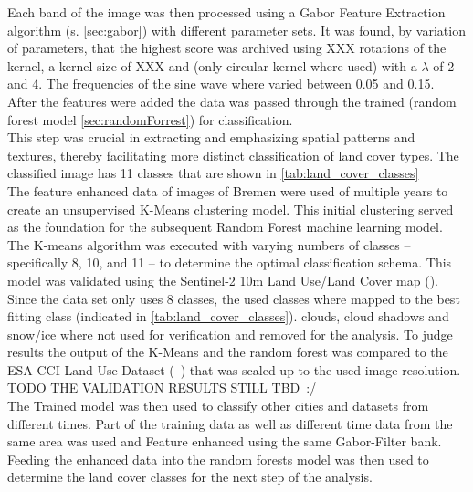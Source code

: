 \documentclass[12pt,a4paper, english,twoside]{article}
\begin{document}
    Each band of the image was then processed using a Gabor Feature Extraction algorithm (s. \cref{sec:gabor}) with different parameter sets. 
    It was found, by variation of parameters, that the highest score was archived using XXX 
    rotations of the kernel, a kernel size of XXX
    and (only circular kernel where used) with a $\lambda$ of 2 and 4. %
    The frequencies of the sine wave where varied between 0.05 and 0.15. \\ 
    After the features were added the data was passed through the trained (random forest model \cref{sec:randomForrest}) for classification. \\
%
    This step was crucial in extracting and emphasizing spatial patterns and textures, thereby facilitating more distinct classification of land cover types. %
    The classified image has 11 classes that are shown in \cref{tab:land_cover_classes}
    \\
    The feature enhanced data of images of Bremen%
    were used of multiple years to create an unsupervised K-Means clustering model.%
    This initial clustering served as the foundation for the subsequent Random Forest machine learning model.
    The K-means algorithm was executed with varying numbers of classes – specifically 8, 10, and 11 – to determine the optimal classification schema.
    This model was validated using the Sentinel-2 10m Land Use/Land Cover map (\cite{Zhang}).
    Since the data set only uses 8 classes, the used classes where mapped to the best fitting class (indicated in \cref{tab:land_cover_classes}). 
    clouds, cloud shadows and snow/ice where not used for verification and removed for the analysis.
    To judge results the output of the K-Means and the random forest was compared to the ESA CCI Land Use Dataset (~\cite{landformclassicationusingfuzzykmeans2000}) that was scaled up to the used image resolution. %
    \\
    TODO THE VALIDATION RESULTS STILL TBD~:/%
    \\ 
    The Trained model was then used to classify other cities and datasets from different times. 
    Part of the training data as well as different time data from the same area was used and Feature enhanced using the same Gabor-Filter bank.
    Feeding the enhanced data into the random forests model was then used to determine the land cover classes for the next step of the analysis.
\end{document}
